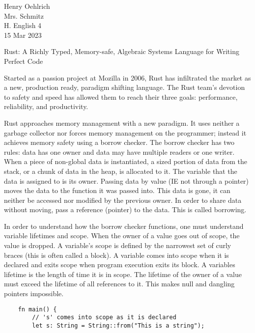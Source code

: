 \documentclass[12pt]{article}
\author{Henry Oehlrich}
\begin{document}
\begin{flushleft}
Henry Oehlrich \\
Mrs. Schmitz \\
H. English 4 \\
15 Mar 2023 \\
\begin{center}
Rust: A Richly Typed, Memory-safe, Algebraic Systems Language for Writing Perfect Code
\end{center}
\setlength{\parindent}{0.5in}


Started as a passion project at Mozilla in 2006, Rust has infiltrated the
market as a new, production ready, paradigm shifting language. The Rust team's
devotion to safety and speed has allowed them to reach their three goals:
performance, reliability, and productivity.


Rust approaches memory management with a new paradigm. It uses neither a
garbage collector nor forces memory management on the programmer; instead it
achieves memory safety using a borrow checker. The borrow checker has two
rules: data has one owner and data may have multiple readers or one writer.
When a piece of non-global data is instantiated, a sized portion of data from
the stack, or a chunk of data in the heap, is allocated to it. The variable
that the data is assigned to is its owner. Passing data by value (IE not
through a pointer) moves the data to the function it was passed into. This data
is gone, it can neither be accessed nor modified by the previous owner. In
order to share data without moving, pass a reference (pointer) to the data.
This is called borrowing. 

In order to understand how the borrow checker functions, one must understand
variable lifetimes and scope. When the owner of a value goes out of scope, the
value is dropped. A variable's scope is defined by the narrowest set of curly
braces (this is often called a block). A variable comes into scope when it is
declared and exits scope when program execution exits its block. A variables
lifetime is the length of time it is in scope. The lifetime of the owner of a
value must exceed the lifetime of all references to it. This makes null and
dangling pointers impossible.

\singlespacing{}
\begin{verbatim}
    fn main() {
        // 's' comes into scope as it is declared
        let s: String = String::from("This is a string");


\end{verbatim}
\end{flushleft}
\end{document}
